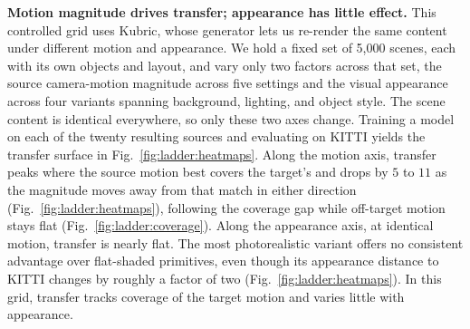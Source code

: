 \noindent\textbf{Motion magnitude drives transfer; appearance has little effect.}
This controlled grid uses Kubric, whose generator lets us re-render the same content
under different motion and appearance. We hold a fixed set of 5{,}000 scenes, each
with its own objects and layout, and vary only two factors across that set, the
source camera-motion magnitude across five settings and the visual appearance across
four variants spanning background, lighting, and object style. The scene content is
identical everywhere, so only these two axes change. Training a model on each of the
twenty resulting sources and evaluating on KITTI yields the transfer surface in
Fig.~\ref{fig:ladder:heatmaps}. Along the motion axis, transfer peaks where the source motion
best covers the target's and drops by $5$ to $11$ \pck{} as the magnitude moves away
from that match in either direction (Fig.~\ref{fig:ladder:heatmaps}), following the
coverage gap while off-target motion stays flat (Fig.~\ref{fig:ladder:coverage}).
Along the appearance axis, at identical motion, transfer is nearly flat. The most
photorealistic variant offers no consistent advantage over flat-shaded primitives,
even though its appearance distance to KITTI changes by roughly a factor of two
(Fig.~\ref{fig:ladder:heatmaps}). In this grid, transfer tracks coverage of the
target motion and varies little with appearance.

